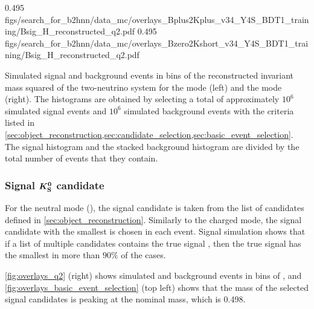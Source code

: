 \def \overlaytext {The histograms are obtained by selecting a total of approximately $10^6$ simulated signal events and $10^6$ simulated background events with the criteria listed in \cref{sec:object_reconstruction,sec:candidate_selection,sec:basic_event_selection}.
The signal histogram and the stacked background histogram are divided by the total number of events that they contain.
}

{0.495}
{figs/search_for_b2hnn/data_mc/overlays_Bplus2Kplus_v34_Y4S_BDT1_training/Bsig_H_reconstructed_q2.pdf}
{0.495}
{figs/search_for_b2hnn/data_mc/overlays_Bzero2Kshort_v34_Y4S_BDT1_training/Bsig_H_reconstructed_q2.pdf}
{
Simulated signal and background events in bins of the reconstructed invariant mass squared of the two-neutrino system for the \BKpnn mode (left) and the \BKznn mode (right).
\overlaytext
}
\subsubsection*{Signal $\boldsymbol{K^0_{\mathrm{S}}}$ candidate}
For the neutral mode (\BKznn), the signal \KS candidate is taken from the list of \KS candidates defined in \cref{sec:object_reconstruction}.
Similarly to the charged mode, the signal \KS candidate with the smallest \qrec is chosen in each event.
Signal simulation shows that if a list of multiple candidates contains the true signal \KS, then the true signal \KS has the smallest \qrec in more than $90\%$ of the cases. %

\cref{fig:overlays_q2} (right) shows simulated \BKznn and background events in bins of \qrec, and \cref{fig:overlays_basic_event_selection} (top left) shows that the mass of the selected signal \KS candidates is peaking at the nominal \KS mass, which is 0.498\gevcc \cite{ParticleDataGroup:2020ssz}.
